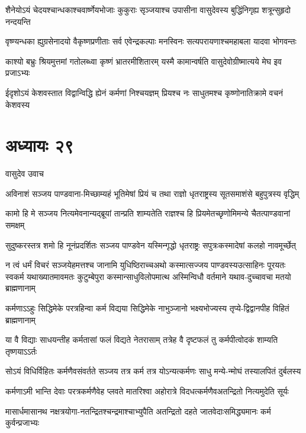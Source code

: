 \twolineshloka
{शैनेयोऽयं चेदयश्चान्धकाश्चवार्ष्णेयभोजाः कुकुराः सृञ्जयाश्च}
{उपासीना वासुदेवस्य बुद्धिंनिगृह्य शत्रून्सुहृदो नन्दयन्ति}


\twolineshloka
{वृष्ण्यन्धका ह्युग्रसेनादयो वैकृष्णप्रणीताः सर्व एवेन्द्रकल्पाः}
{मनस्विनः सत्यपरायणाश्चमहाबला यादवा भोगवन्तः}


\twolineshloka
{काश्यो बभ्रुः श्रियमुत्तमां गतोलब्ध्वा कृष्णं भ्रातरमीशितारम्}
{यस्मै कामान्वर्षति वासुदेवोग्रीष्मात्यये मेघ इव प्रजाऽभ्यः}


\twolineshloka
{ईदृशोऽयं केशवस्तात विद्वान्विद्धि ह्येनं कर्मणां निश्चयज्ञम्}
{प्रियश्च नः साधुतमश्च कृष्णोनातिक्रामे वचनं केशवस्य}


\chapter{अध्यायः २९}
\twolineshloka
{वासुदेव उवाच}
{}


\twolineshloka
{अविनाशं सञ्जय पाण्डवाना-मिच्छाम्यहं भूतिमेषां प्रियं च}
{तथा राज्ञो धृतराष्ट्रस्य सूतसमाशंसे बहुपुत्रस्य वृद्धिम्}


\twolineshloka
{कामो हि मे सञ्जय नित्यमेवनान्यद्ब्रूयां तान्प्रति शाम्यतेति}
{राज्ञश्च हि प्रियमेतच्छृणोमिमन्ये चैतत्पाण्डवानां समक्षम्}


\twolineshloka
{सुदुष्करस्तत्र शमो हि नूनंप्रदर्शितः सञ्जय पाण्डवेन}
{यस्मिन्गृद्धो धृतराष्ट्रः सपुत्रःकस्मादेषां कलहो नावमूर्च्छेत्}


न त्वं धर्मं विचरं सञ्जयेहमत्तश्च जानामि युधिष्ठिराच्चअथो कस्मात्सज्जय पाण्डवस्यउत्साहिनः पूरयतः स्वकर्म
\twolineshloka
{यथाख्यातमावमतः कुटुम्बेपुरा कस्मान्साधुविलोपमात्थ}
{अस्मिन्विधौ वर्तमाने यथाव-दुच्चावचा मतयो ब्राह्मणानाम्}


\twolineshloka
{कर्मणाऽऽहुः सिद्धिमेके परत्रहिन्वा कर्म विद्यया सिद्धिमेके}
{नाभुञ्जानो भक्ष्यभोज्यस्य तृप्ये-द्विद्वानपीह विहितं ब्राह्मणानाम्}


\twolineshloka
{या वै विद्याः साधयन्तीह कर्मतासां फलं विद्यते नेतरासाम्}
{तत्रेह वै दृष्टफलं तु कर्मपीत्वोदकं शाम्यति तृष्णयाऽऽर्तः}


\twolineshloka
{सोऽयं विधिर्विहितः कर्मणैवसंवर्तते सञ्जय तत्र कर्म}
{तत्र योऽन्यत्कर्मणः साधु मन्ये-न्मोघं तस्यालपितं दुर्बलस्य}


\twolineshloka
{कर्मणाऽमी भान्ति देवाः परत्रकर्मणैवेह प्लवते मातरिश्वा}
{अहोरात्रे विदधत्कर्मणैवअतन्द्रितो नित्यमुदेति सूर्यः}


\twolineshloka
{मासार्धमासानथ नक्षत्रयोगा-नतन्द्रितश्चन्द्रमाश्चाभ्युपैति}
{अतन्द्रितो दहते जातवेदाःसमिद्ध्यमानः कर्म कुर्वन्प्रजाभ्यः}


